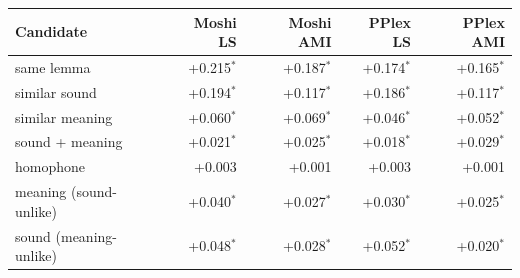 \begin{tabular}{lrrrr}
\toprule
Candidate & Moshi LS & Moshi AMI & PPlex LS & PPlex AMI \\
\midrule
same lemma & +0.215$^{*}$ & +0.187$^{*}$ & +0.174$^{*}$ & +0.165$^{*}$ \\
similar sound & +0.194$^{*}$ & +0.117$^{*}$ & +0.186$^{*}$ & +0.117$^{*}$ \\
similar meaning & +0.060$^{*}$ & +0.069$^{*}$ & +0.046$^{*}$ & +0.052$^{*}$ \\
sound + meaning & +0.021$^{*}$ & +0.025$^{*}$ & +0.018$^{*}$ & +0.029$^{*}$ \\
homophone & +0.003 & +0.001 & +0.003 & +0.001 \\
\midrule
meaning (sound-unlike) & +0.040$^{*}$ & +0.027$^{*}$ & +0.030$^{*}$ & +0.025$^{*}$ \\
sound (meaning-unlike) & +0.048$^{*}$ & +0.028$^{*}$ & +0.052$^{*}$ & +0.020$^{*}$ \\
\bottomrule
\end{tabular}